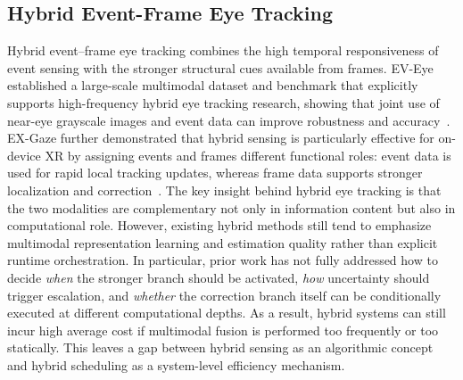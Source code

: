 \documentclass[journal]{IEEEtran}
\begin{document}
\subsection{Hybrid Event-Frame Eye Tracking}
Hybrid event--frame eye tracking combines the high temporal responsiveness of event sensing with the stronger structural cues available from frames. EV-Eye established a large-scale multimodal dataset and benchmark that explicitly supports high-frequency hybrid eye tracking research, showing that joint use of near-eye grayscale images and event data can improve robustness and accuracy~\cite{zhao2023ev}. EX-Gaze further demonstrated that hybrid sensing is particularly effective for on-device XR by assigning events and frames different functional roles: event data is used for rapid local tracking updates, whereas frame data supports stronger localization and correction~\cite{chen2025ex}.
%
The key insight behind hybrid eye tracking is that the two modalities are complementary not only in information content but also in computational role. However, existing hybrid methods still tend to emphasize multimodal representation learning and estimation quality rather than explicit runtime orchestration. In particular, prior work has not fully addressed how to decide \emph{when} the stronger branch should be activated, \emph{how} uncertainty should trigger escalation, and \emph{whether} the correction branch itself can be conditionally executed at different computational depths. As a result, hybrid systems can still incur high average cost if multimodal fusion is performed too frequently or too statically. This leaves a gap between hybrid sensing as an algorithmic concept and hybrid scheduling as a system-level efficiency mechanism.
%
\end{document}
